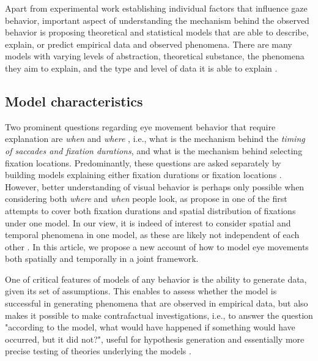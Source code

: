 \documentclass{article}
\begin{document}
Apart from experimental work establishing individual factors that influence gaze behavior, important aspect of understanding the mechanism behind the observed behavior is proposing theoretical and statistical models that are able to describe, explain, or predict empirical data and observed phenomena. There are many models with varying levels of abstraction, theoretical substance, the phenomena they aim to explain, and the type and level of data it is able to explain \citep{tatler2017latest,trukenbrod2014icat,nuthmann2017fixation_durations,zelinsky2013modelling,schutt2017likelihood,schwetlick2020ccenewalk_extendeds,le_meur2015saccadic,malem2020exploration}. 

\subsection{Model characteristics}

Two prominent questions regarding eye movement behavior that require explanation are \textit{when} and \textit{where} \citep{findlay1999model,tatler2017latest}, i.e., what is the mechanism behind the \textit{timing of saccades and fixation durations}, and what is the mechanism behind selecting fixation locations. Predominantly, these questions are asked separately by building models explaining either fixation durations or fixation locations \citep{tatler2017latest,schutt2017likelihood}. However, better understanding of visual behavior is perhaps only possible when considering both \textit{where} and \textit{when} people look, as \citet{tatler2017latest} propose in one of the first attempts to cover both fixation durations and spatial distribution of fixations under one model. In our view, it is indeed of interest to consider spatial and temporal phenomena in one model, as these are likely not independent of each other \citep[e.g., ][]{nuthmann2017fixation_durations}. In this article, we propose a new account of how to model eye movements both spatially and temporally in a joint framework.

One of critical features of models of any behavior is the ability to generate data, given its set of assumptions. This enables to assess whether the model is successful in generating phenomena that are observed in empirical data, but also makes it possible to make contrafactual investigations, i.e., to answer the question "according to the model, what would have happened if something would have occurred, but it did not?", useful for hypothesis generation and essentially more precise testing of theories underlying the models \citep{borsboom2020theory,nuthmann2010crisp}.
\end{document}
